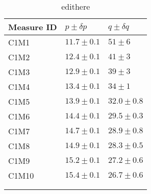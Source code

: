\begin{longtable}{@{}lll@{}}
\toprule
Measure ID & $p \pm \delta p$ & $q \pm \delta q$ \tabularnewline
\midrule
C1M1 & $11.7 \pm 0.1$ & $51 \pm 6$ \tabularnewline
C1M2 & $12.4 \pm 0.1$ & $41 \pm 3$ \tabularnewline
C1M3 & $12.9 \pm 0.1$ & $39 \pm 3$ \tabularnewline
C1M4 & $13.4 \pm 0.1$ & $34 \pm 1$ \tabularnewline
C1M5 & $13.9 \pm 0.1$ & $32.0 \pm 0.8$ \tabularnewline
C1M6 & $14.4 \pm 0.1$ & $29.5 \pm 0.3$ \tabularnewline
C1M7 & $14.7 \pm 0.1$ & $28.9 \pm 0.8$ \tabularnewline
C1M8 & $14.9 \pm 0.1$ & $28.3 \pm 0.5$ \tabularnewline
C1M9 & $15.2 \pm 0.1$ & $27.2 \pm 0.6$ \tabularnewline
C1M10 & $15.4 \pm 0.1$ & $26.7 \pm 0.6$ \tabularnewline
\bottomrule
\label{tab:edithere}
\\
\caption{edithere}
\end{longtable}
